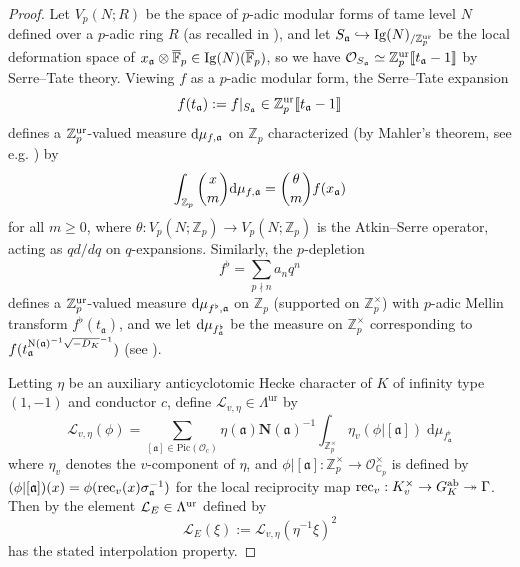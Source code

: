 \documentclass[10pt]{amsart}
\numberwithin{equation}{section}
\theoremstyle{definition}
\theoremstyle{remark}
\newcommand{\Z}{\mathbb{Z}}
\newcommand{\bZ}{\mathbb{Z}}
\begin{document}
\begin{proof}
Let $V_p(N;R)$ be the space of $p$-adic modular forms of tame level $N$ defined over a $p$-adic ring $R$ (as recalled in \cite[\S{2.2}]{cas-hsieh1}), and let $S_{\mathfrak{a}}\hookrightarrow{\rm Ig}(N)_{/\Z_p^{\rm ur}}$ be the local deformation space of $x_\mathfrak{a}\otimes\overline{\mathbb{F}}_p\in{\rm Ig}(N)(\overline{\mathbb{F}}_p)$, so we have $\mathcal{O}_{S_{\mathfrak{a}}}\simeq\Z_p^{\rm ur}\llbracket t_\mathfrak{a}-1\rrbracket$ by Serre--Tate theory. Viewing $f$ as a $p$-adic modular form, the Serre--Tate expansion 
\[
f(t_{\mathfrak{a}}):=f\vert_{S_\mathfrak{a}}\in\bZ_p^{\rm ur}\llbracket t_{\mathfrak{a}}-1\rrbracket 
\]
defines a $\Z_p^{\rm ur}$-valued measure ${\rm d}\mu_{f,\mathfrak{a}}$ on $\Z_p$ characterized (by Mahler's theorem, see e.g. \cite[\S{3.3}, Thm.~1]{hida-blue}) by
\begin{equation}\label{eq:def-meas}
\int_{\Z_p}\binom{x}{m}{\rm d}\mu_{f,{\mathfrak{a}}}=\binom{\theta}{m}f(x_{\mathfrak{a}})
\end{equation}
for all $m\geqslant 0$, %
where $\theta:V_p(N;\Z_p)\rightarrow V_p(N;\Z_p)$ is the Atkin--Serre operator, acting as $qd/dq$ on $q$-expansions. Similarly, the $p$-depletion 
\[
f^\flat=\sum_{p\nmid n}a_nq^n
\]
defines a $\Z_p^{\rm ur}$-valued measure ${\rm d}\mu_{f^\flat,\mathfrak{a}}$  on $\Z_p$ (supported on $\Z_p^\times$) with $p$-adic Mellin transform $f^\flat(t_\mathfrak{a})$, and we let ${\rm d}\mu_{f^\flat_{\mathfrak{a}}}$ be the measure on $\Z_p^\times$ corresponding to $f(t_{\mathfrak{a}}^{{\rm N}(\mathfrak{a})^{-1}\sqrt{-D_K}^{-1}})$ (see \cite[Prop.~3.3]{cas-hsieh1}).

Letting $\eta$ be an auxiliary anticyclotomic Hecke character of $K$ of infinity type $(1,-1)$ and conductor $c$, define $\mathscr{L}_{v,\eta}\in\Lambda^{\mathrm{ur}}$ by
\begin{equation}\label{eq:cusp-measure}
\mathscr{L}_{v,\eta}(\phi)=
\sum_{[\mathfrak{a}]\in\mathrm{Pic}(\mathcal{O}_c)}
\eta(\mathfrak{a})\mathbf{N}(\mathfrak{a})^{-1}
\int_{\Z_p^\times}\eta_v(\phi\vert[\mathfrak{a}])\;\mathrm{d}\mu_{f^\flat_\mathfrak{a}}
\end{equation}
where $\eta_v$ denotes the $v$-component of $\eta$, and $\phi\vert[\mathfrak{a}]:\Z_p^\times\rightarrow\mathcal{O}_{\mathbb{C}_p}^\times$ is defined by $(\phi\vert[\mathfrak{a}])(x)=\phi({\rm rec}_v(x)\sigma_{\mathfrak{a}}^{-1})$ for the local reciprocity map ${\rm rec}_v:K_v^\times\rightarrow G_K^{\rm ab}\twoheadrightarrow\Gamma$. Then by \cite[Prop.~3.8]{cas-hsieh1} the element $\mathcal{L}_E\in\Lambda^{\rm ur}$
defined by
\[
\mathcal{L}_E(\xi):=\mathscr{L}_{v,\eta}(\eta^{-1}\xi)^2
\]
has the stated interpolation property. 
\end{proof}
\end{document}

